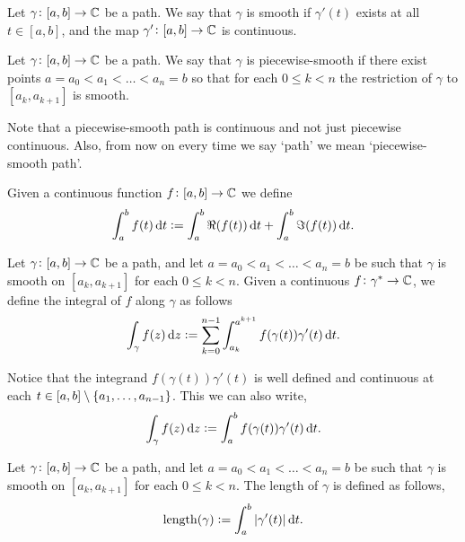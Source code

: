 \documentclass[11pt,a4paper]{article}
\newcommand{\length}{\mathrm{length}}
\begin{document}
\begin{definition}
  Let $\gamma \colon [a, b] \to \mathbb{C}$ be a path.
  We say that $\gamma$ is smooth if $\gamma'(t)$ exists at all 
  $t \in [a, b]$, and the map $\gamma' \colon [a, b] \to \mathbb{C}$ is continuous.
\end{definition}

\begin{definition}
  Let $\gamma \colon [a, b] \to \mathbb{C}$ be a path.
  We say that $\gamma$ is piecewise-smooth if there exist points 
  $a = a_0 < a_1 < \dots < a_n = b$ so that
  for each $0 \le k < n$ the restriction of $\gamma$ to $[a_k, a_{k+1}]$
  is smooth.
\end{definition}

\begin{remark}
  Note that a piecewise-smooth path is continuous and not just
  piecewise continuous. Also, from now on every time we say `path' we mean
  `piecewise-smooth path'.
\end{remark}

\begin{definition}[Integral]
  Given a continuous function $f \colon [a,b] \to \mathbb{C}$ we define
  \[
    \int_{a}^{b} f(t) \dt :=
    \int_{a}^{b} \Re(f(t)) \dt +
    \int_{a}^{b} \Im(f(t)) \dt.
  \]
\end{definition}

\begin{definition}
  Let $\gamma \colon [a, b] \to \mathbb{C}$ be a path,
  and let $a = a_0 < a_1 < \dots < a_n = b$
  be such that $\gamma$ is smooth on $[a_k, a_{k+1}]$ for each 
  $0 \le k < n$.
  Given a continuous $f \colon \gamma^* \to \mathbb{C}$,
  we define the integral of $f$ along $\gamma$ as follows
  \[
    \int_{\gamma} f(z) \dz :=
    \sum_{k=0}^{n-1} \int_{a_k}^{a^{k+1}} f(\gamma(t)) \gamma'(t) \dt.
  \]
\end{definition}
\begin{remark}
  Notice that the integrand $f(\gamma(t)) \gamma'(t)$ is well defined
  and continuous at each $t \in [a,b] \setminus \set{a_1,\dots,a_{n-1}}$.
  This we can also write,
  \[
    \int_{\gamma} f(z) \dz :=
    \int_{a}^{b} f(\gamma(t)) \gamma'(t) \dt.
  \]
\end{remark}

\begin{definition}
  Let $\gamma \colon [a, b] \to \mathbb{C}$ be a path,
  and let $a = a_0 < a_1 < \dots < a_n = b$
  be such that $\gamma$ is smooth on $[a_k, a_{k+1}]$ for each 
  $0 \le k < n$.
  The length of $\gamma$ is defined as follows,
  \[
    \length(\gamma) := \int_{a}^{b} |\gamma'(t)| \dt.
  \]
\end{definition}
\end{document}
